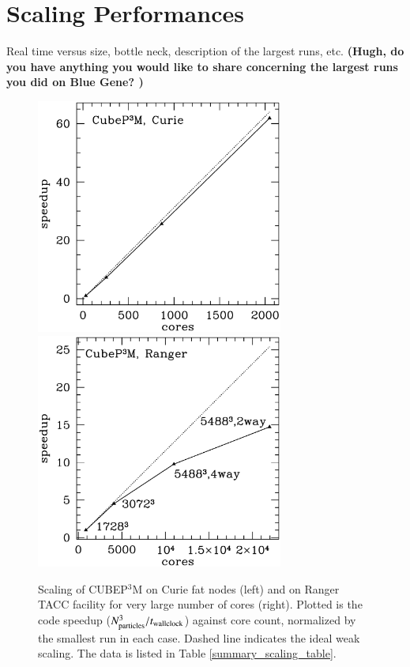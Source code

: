 \section{Scaling Performances}

Real time versus size, bottle neck, description of the largest runs, etc.
{\bf (Hugh, do you have anything you would like to share 
concerning the largest runs you did on Blue Gene? )} 

\begin{figure}%
  \begin{center}
    \includegraphics[width=3.2in]{graphs/scaling_cubep3m_curie.eps}
    \includegraphics[width=3.2in]{graphs/scaling_cubep3m_new.eps}
  \caption{Scaling of {\small CUBEP$^3$M} on Curie fat nodes (left) and 
    on Ranger TACC facility for very large number of cores (right). Plotted is the code speedup 
    ($N_{\rm particles}^3/t_{\rm wallclock}$) against core count, normalized by the smallest run 
    in each case. Dashed line indicates the ideal weak 
    scaling. The data is listed in Table \ref{summary_scaling_table}.
    \label{scaling}
}
\end{center}
\end{figure}

